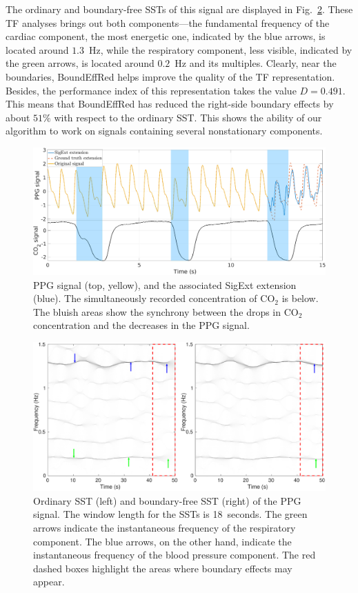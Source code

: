 \documentclass[journal,onecolumn]{IEEEtran}
\begin{document}
The ordinary and boundary-free SSTs of this signal are displayed in Fig.~\ref{fig:ppg2.sst}. These TF analyses brings out both components---the fundamental frequency of the cardiac component, the most energetic one, indicated by the blue arrows, is located around $1.3$~Hz, while the respiratory component, less visible, indicated by the green arrows, is located around $0.2$~Hz  and its multiples. Clearly, near the boundaries, {\sf BoundEffRed} helps improve the quality of the TF representation. Besides, the performance index of this representation takes the value $D=0.491$. This means that {\sf BoundEffRed} has reduced the right-side boundary effects by about $51\%$ with respect to the ordinary SST. This shows the ability of our algorithm to work on signals containing several nonstationary components.

\begin{figure}
\centering
\includegraphics[width=\textwidth]{PPG2.eps}
\caption{PPG signal (top, yellow), and the associated
{\sf SigExt} extension (blue). The simultaneously recorded concentration of $\mathrm{CO}_2$ is below. The bluish areas show the synchrony between the drops in $\mathrm{CO}_2$ concentration and the decreases in the PPG signal.}
\label{fig:ppg2}
\end{figure} 

\begin{figure}
\centering
\includegraphics[width=\textwidth]{PPG2sst.eps}
\caption{Ordinary SST (left) and boundary-free SST (right) of the PPG signal. The window length for the SSTs is 18~seconds. The green arrows indicate the instantaneous frequency of the respiratory component. The blue arrows, on the other hand, indicate the instantaneous frequency of the blood pressure component. The red dashed boxes highlight the areas where boundary effects may appear.}
\label{fig:ppg2.sst}
\end{figure} 



\end{document}
